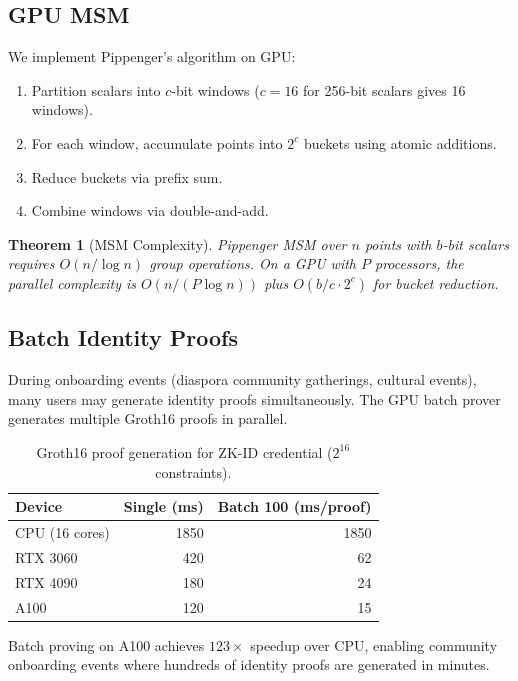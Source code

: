 \documentclass[11pt,a4paper]{article}
\newtheorem{theorem}{Theorem}[section]
\begin{document}
\subsection{GPU MSM}

We implement Pippenger's algorithm on GPU:

\begin{enumerate}
    \item Partition scalars into $c$-bit windows ($c = 16$ for 256-bit
    scalars gives 16 windows).
    \item For each window, accumulate points into $2^c$ buckets using
    atomic additions.
    \item Reduce buckets via prefix sum.
    \item Combine windows via double-and-add.
\end{enumerate}

\begin{theorem}[MSM Complexity]
    Pippenger MSM over $n$ points with $b$-bit scalars requires
    $O(n / \log n)$ group operations.  On a GPU with $P$ processors,
    the parallel complexity is $O(n / (P \log n))$ plus $O(b/c \cdot 2^c)$
    for bucket reduction.
\end{theorem}

\subsection{Batch Identity Proofs}

During onboarding events (diaspora community gatherings, cultural
events), many users may generate identity proofs simultaneously.  The
GPU batch prover generates multiple Groth16 proofs in parallel.

\begin{table}[h]
\centering
\caption{Groth16 proof generation for ZK-ID credential ($2^{16}$ constraints).}
\label{tab:groth16_gpu}
\begin{tabular}{@{}lrr@{}}
\toprule
\textbf{Device} & \textbf{Single (ms)} & \textbf{Batch 100 (ms/proof)} \\
\midrule
CPU (16 cores) & 1850 & 1850 \\
RTX 3060       & 420  & 62 \\
RTX 4090       & 180  & 24 \\
A100           & 120  & 15 \\
\bottomrule
\end{tabular}
\end{table}

Batch proving on A100 achieves $123\times$ speedup over CPU, enabling
community onboarding events where hundreds of identity proofs are
generated in minutes.
\end{document}

